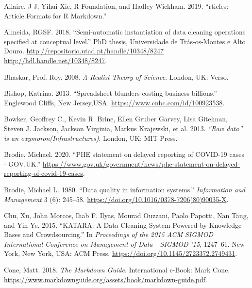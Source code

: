 \documentclass[
]{article}
\newlength{\cslhangindent}
\newlength{\cslentryspacingunit} %
\newenvironment{CSLReferences}[2] %
 {%
  \setlength{\parindent}{0pt}
  \ifodd #1
  \let\oldpar\par
  \def\par{\hangindent=\cslhangindent\oldpar}
  \fi
  \setlength{\parskip}{#2\cslentryspacingunit}
 }%
 {}
\begin{document}
\hypertarget{refs}{}
\begin{CSLReferences}{1}{0}
\leavevmode{}%
Allaire, J J, Yihui Xie, R Foundation, and Hadley Wickham. 2019.
{``{rticles: Article Formats for R Markdown}.''}

\leavevmode{}%
Almeida, RGSF. 2018. {``{Semi-automatic instantiation of data cleaning
operations specified at conceptual level}.''} PhD thesis, Universidade
de Tr{á}s-os-Montes e Alto Douro.
\href{http://repositorio.utad.pt/handle/10348/8247\%20http://hdl.handle.net/10348/8247}{http://repositorio.utad.pt/handle/10348/8247
http://hdl.handle.net/10348/8247}.

\leavevmode{}%
Bhaskar, Prof. Roy. 2008. \emph{{A Realist Theory of Science}}. London,
UK: Verso.

\leavevmode{}%
Bishop, Katrina. 2013. {``{Spreadsheet blunders costing business
billions}.''} Englewood Cliffs, New Jersey,USA.
\url{https://www.cnbc.com/id/100923538}.

\leavevmode{}%
Bowker, Geoffrey C., Kevin R. Brine, Ellen Gruber Garvey, Lisa Gitelman,
Steven J. Jackson, Jackson Virginia, Markus Krajewski, et al. 2013.
\emph{{{``Raw data''} is an oxymoron(Infrastructures)}}. London, UK: MIT
Press.

\leavevmode{}%
Brodie, Michael. 2020. {``{PHE statement on delayed reporting of
COVID-19 cases - GOV.UK}.''}
\url{https://www.gov.uk/government/news/phe-statement-on-delayed-reporting-of-covid-19-cases}.

\leavevmode{}%
Brodie, Michael L. 1980. {``{Data quality in information systems}.''}
\emph{Information and Management} 3 (6): 245--58.
\url{https://doi.org/10.1016/0378-7206(80)90035-X}.

\leavevmode{}%
Chu, Xu, John Morcos, Ihab F. Ilyas, Mourad Ouzzani, Paolo Papotti, Nan
Tang, and Yin Ye. 2015. {``{KATARA: A Data Cleaning System Powered by
Knowledge Bases and Crowdsourcing}.''} In \emph{Proceedings of the 2015
ACM SIGMOD International Conference on Management of Data - SIGMOD '15},
1247--61. New York, New York, USA: ACM Press.
\url{https://doi.org/10.1145/2723372.2749431}.

\leavevmode{}%
Cone, Matt. 2018. \emph{{The Markdown Guide}}. International e-Book:
Mark Cone.
\url{https://www.markdownguide.org/assets/book/markdown-guide.pdf}.


\end{CSLReferences}
\end{document}

